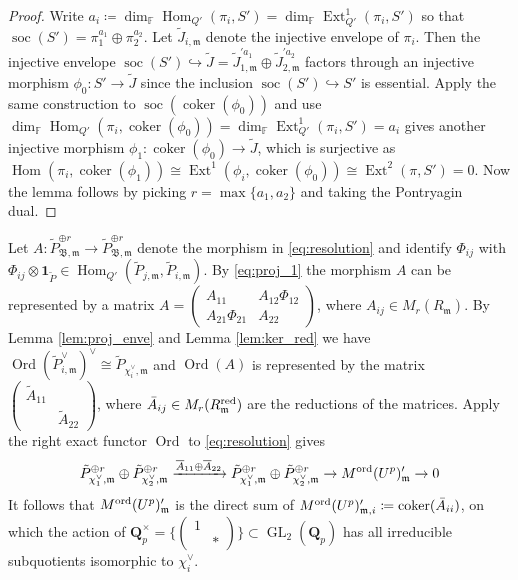 \documentclass[leqno]{amsart}
\theoremstyle{definition}
\theoremstyle{remark}
\newcommand{\smat}[1]{\left(\begin{smallmatrix} #1 \end{smallmatrix}\right)}
\newcommand{\id}{\mathbf{1}}
\newcommand{\fF}{\mathbb{F}} %
\newcommand{\Qp}{\mathbf{Q}_p}
\newcommand{\A}{\mathbf A}
\DeclareMathOperator{\Hom}{Hom}
\DeclareMathOperator{\Ext}{Ext}
\DeclareMathOperator{\coker}{coker}
\DeclareMathOperator{\GL}{GL}
\newcommand{\fm}{\mathfrak{m}}
\DeclareMathOperator{\Ord}{Ord} %
\DeclareMathOperator{\soc}{soc}
\newcommand{\B}{\mathfrak B} %
\newcommand{\red}{\textnormal{red}}
\newcommand{\ord}{\textnormal{ord}} %
\begin{document}
\begin{proof}
Write $a_i\coloneqq \dim_{\fF} \Hom_{Q'}(\pi_i,S')=
\dim_{\fF} \Ext^1_{Q'}(\pi_i,S')$
so that $\soc(S')=\pi_1^{a_1}\oplus \pi_2^{a_2}$.
Let $\tilde{J}_{i,\fm}$ denote 
the injective envelope of $\pi_i$.
Then the injective envelope 
$\soc(S')\hookrightarrow \tilde{J}=
\tilde{J}_{1,\fm}^{'a_1}\oplus \tilde{J}_{2,\fm}^{'a_2}$
factors through an injective morphism 
$\phi_0\colon S'\to \tilde{J}$
since the inclusion $\soc(S')\hookrightarrow S'$
is essential.
Apply the same construction 
to $\soc(\coker(\phi_0))$
and use $\dim_{\fF}\Hom_{Q'}(\pi_i, \coker(\phi_0))=
\dim_{\fF}\Ext^1_{Q'}(\pi_i, S')=a_i$
gives another injective morphism
$\phi_1\colon \coker(\phi_0)\to \tilde{J}$,
which is surjective as 
$\Hom(\pi_i,\coker(\phi_1))
\cong \Ext^1(\phi_i,\coker(\phi_0))
\cong \Ext^2(\pi, S')=0$.
Now the lemma follows by picking
$r=\max\{a_1,a_2\}$ and taking the Pontryagin dual.
\end{proof}

Let 
$A\colon \tilde{P}_{\B,\fm}^{\oplus r}\to\tilde{P}_{\B,\fm}^{\oplus r}$ 
denote the morphism in \eqref{eq:resolution} and
identify $\Phi_{ij}$ with $\Phi_{ij}\otimes \id_{\tilde{P}}\in
\Hom_{Q'}(\tilde{P}_{j,\fm},\tilde{P}_{i,\fm})$.
By \eqref{eq:proj_1}
the morphism $A$
can be represented by a matrix
$A=\smat{A_{11} & A_{12}\Phi_{12}\\A_{21}\Phi_{21} & A_{22}}$,
where $A_{ij}\in M_r(R_{\fm})$.
By Lemma \ref{lem:proj_enve}
and Lemma \ref{lem:ker_red} we have
$\Ord(\tilde{P}_{i,\fm}^\vee)^\vee\cong 
\tilde{P}_{\chi_i^\vee,\fm}$
and $\Ord(A)$ is represented by the matrix
$\smat{\tilde{A}_{11} & \\& \tilde{A}_{22}}$,
where $\bar{A}_{ij}\in M_r(R^{\red}_{\fm})$ are 
the reductions of the matrices.
Apply the right exact functor
$\Ord$ to 
\eqref{eq:resolution} gives
\begin{equation}\label{eq:exact_ord}
	\tilde{P}_{\chi_1^\vee,\fm}^{\oplus r}\oplus 
	\tilde{P}_{\chi_2^\vee,\fm}^{\oplus r}
	\xrightarrow{\overline{A}_{11}\oplus\overline{A}_{22}}
	\tilde{P}_{\chi_1^\vee,\fm}^{\oplus r}\oplus 
	\tilde{P}_{\chi_2^\vee,\fm}^{\oplus r}
	\to M^{\ord}(U^p)_\fm'\to 0
\end{equation}
It follows that 
$M^{\ord}(U^p)_\fm'$ is the direct sum of
$M^{\ord}(U^p)_{\fm,i}'\coloneqq \coker(\bar{A}_{ii})$,
on which the action of 
$\Qp^\times=\{\smat{1&\\&*}\}\subset \GL_2(\Qp)$
has all irreducible subquotients
isomorphic to $\chi_i^\vee$.
\end{document}
